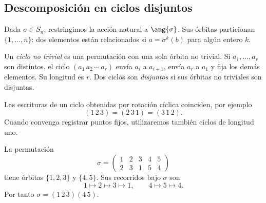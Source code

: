 \subsection{Descomposición en ciclos disjuntos}\label{tema:9-1-1}
Dada $\sigma\in S_n$, restringimos la acción natural a $\ang{\sigma}$. Sus órbitas particionan $\{1,\ldots,n\}$: dos elementos están relacionados si $a=\sigma^k(b)$ para algún entero $k$.
\begin{defi}
Un \emph{ciclo no trivial} es una permutación con una sola órbita no trivial. Si $a_1,\ldots,a_r$ son distintos, el ciclo $(a_1\,a_2\,\cdots\,a_r)$ envía $a_i$ a $a_{i+1}$, envía $a_r$ a $a_1$ y fija los demás elementos. Su longitud es $r$. Dos ciclos son \emph{disjuntos} si sus órbitas no triviales son disjuntas.
\end{defi}
Las escrituras de un ciclo obtenidas por rotación cíclica coinciden, por ejemplo
\[
(1\,2\,3)=(2\,3\,1)=(3\,1\,2).
\]
Cuando convenga registrar puntos fijos, utilizaremos también ciclos de longitud uno.
\begin{ejem}
La permutación
\[
\sigma=\begin{pmatrix}1&2&3&4&5\\2&3&1&5&4\end{pmatrix}
\]
tiene órbitas $\{1,2,3\}$ y $\{4,5\}$. Sus recorridos bajo $\sigma$ son
\[
1\mapsto2\mapsto3\mapsto1,
\qquad 4\mapsto5\mapsto4.
\]
Por tanto $\sigma=(1\,2\,3)(4\,5)$.
\end{ejem}

